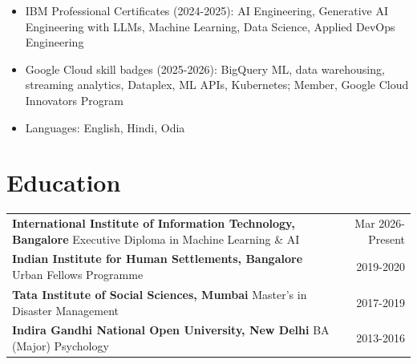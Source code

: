 \documentclass[a4paper,10pt]{article}
\begin{document}
\begin{itemize}[itemsep=1pt]
\item IBM Professional Certificates (2024-2025): AI Engineering, Generative AI Engineering with LLMs, Machine Learning, Data Science, Applied DevOps Engineering
\item Google Cloud skill badges (2025-2026): BigQuery ML, data warehousing, streaming analytics, Dataplex, ML APIs, Kubernetes; Member, Google Cloud Innovators Program
\item Languages: English, Hindi, Odia
\end{itemize}

\section*{Education}

\renewcommand{\arraystretch}{0.95}
\begin{tabularx}{\textwidth}{X r}

\textbf{International Institute of Information Technology, Bangalore} \newline Executive Diploma in Machine Learning \& AI
& {\datefont\small Mar 2026-Present} \\[1mm]

\textbf{Indian Institute for Human Settlements, Bangalore} \newline Urban Fellows Programme
& {\datefont\small 2019-2020} \\[1mm]

\textbf{Tata Institute of Social Sciences, Mumbai} \newline Master's in Disaster Management
& {\datefont\small 2017-2019} \\[1mm]

\textbf{Indira Gandhi National Open University, New Delhi} \newline BA (Major) Psychology
& {\datefont\small 2013-2016} \\

\end{tabularx}
\end{document}
